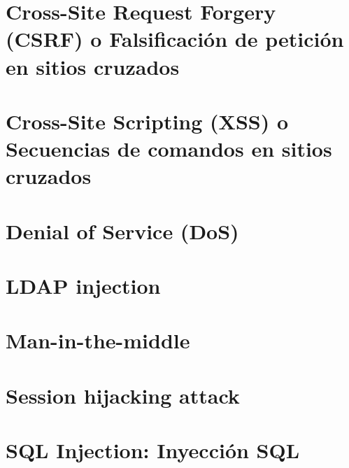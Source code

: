 \documentclass[10pt, a4paper,spanish]{article}
\begin{document}
    \section{Cross-Site Request Forgery (CSRF) o Falsificación de petición en sitios cruzados}
        \paragraph{}


    \section{Cross-Site Scripting (XSS) o Secuencias de comandos en sitios cruzados}
        \paragraph{}


    \section{Denial of Service (DoS)}
        \paragraph{}


    \section{LDAP injection}
        \paragraph{}


    \section{Man-in-the-middle}
        \paragraph{}


    \section{Session hijacking attack}
        \paragraph{}


    \section{SQL Injection: Inyección SQL}
        \paragraph{}
\end{document}
